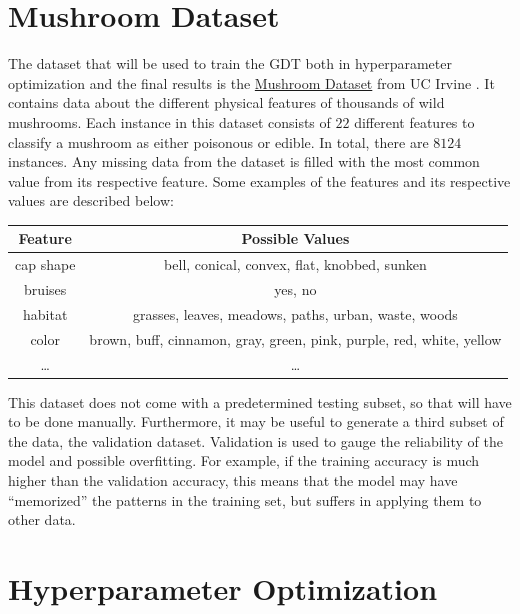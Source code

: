 \documentclass[12pt]{article}
\begin{document}
\section{Mushroom Dataset}

The dataset that will be used to train the GDT both in hyperparameter optimization and the final results is the \href{https://archive-beta.ics.uci.edu/ml/datasets/mushroom}{Mushroom Dataset} from UC Irvine \autocite{misc_mushroom_73}. It contains data about the different physical features of thousands of wild mushrooms. Each instance in this dataset consists of $22$ different features to classify a mushroom as either poisonous or edible. In total, there are $8124$ instances. Any missing data from the dataset is filled with the most common value from its respective feature. Some examples of the features and its respective values are described below:

\begin{center}
    \begin{tabular}{|c|c|}
        \hline
        Feature & Possible Values \\
        \hline \hline
        cap shape & bell, conical, convex, flat, knobbed, sunken \\
        \hline
        bruises & yes, no \\
        \hline
        habitat & grasses, leaves, meadows, paths, urban, waste, woods \\
        \hline
        color & brown, buff, cinnamon, gray, green, pink, purple, red, white, yellow \\
        \hline
        \dots & \dots \\
        \hline
    \end{tabular}
\end{center}

This dataset does not come with a predetermined testing subset, so that will have to be done manually. Furthermore, it may be useful to generate a third subset of the data, the validation dataset. Validation is used to gauge the reliability of the model and possible overfitting. For example, if the training accuracy is much higher than the validation accuracy, this means that the model may have ``memorized'' the patterns in the training set, but suffers in applying them to other data.

\section{Hyperparameter Optimization}
\end{document}
